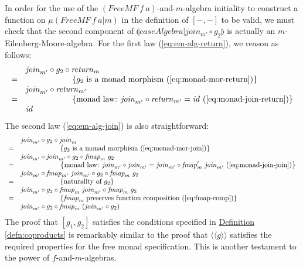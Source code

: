 \documentclass{jfp1}
\newcommand{\eFold}[2]{\llparenthesis #1|#2 \rrparenthesis}
\newcommand{\fmext}[1]{\langle\langle #1 \rangle\rangle}
\newcommand{\eqAnnotation}[1]{\hspace{2cm}\left\{\textrm{#1}\right\}}
\newcommand{\defref}[1]{\hyperref[#1]{Definition \ref*{#1}}}
\begin{document}
In order for the use of the $(\mathit{FreeMF}~f~a)$-and-$m$-algebra
initiality to construct a function on $\mu(\mathit{FreeMF}~f~a|m)$ in
the definition of $[-,-]$ to be valid, we must check that the second
component of $\eFold{\mathit{caseAlgebra}}{\mathit{join_{m'}} \circ
  g_2}$ is actually an $m$-Eilenberg-Moore-algebra. For the first law
(\autoref{eq:em-alg-return}), we reason as follows:
\begin{displaymath}
  \begin{array}{cl}
    & \mathit{join}_{m'} \circ g_2 \circ \mathit{return}_m \\
    =&\eqAnnotation{$g_2$ is a monad morphism (\autoref{eq:monad-mor-return})} \\
    & \mathit{join}_{m'} \circ \mathit{return}_{m'} \\
    =&\eqAnnotation{monad law: $\mathit{join}_{m'} \circ \mathit{return}_{m'} = \mathit{id}$ (\autoref{eq:monad-join-return})} \\
    & \mathit{id}
  \end{array}
\end{displaymath}
The second law (\autoref{eq:em-alg-join}) is also straightforward:
\begin{displaymath}
  \begin{array}{cl}
    & \mathit{join}_{m'} \circ g_2 \circ \mathit{join}_m \\
    =&\eqAnnotation{$g_2$ is a monad morphism (\autoref{eq:monad-mor-join})} \\
    & \mathit{join}_{m'} \circ \mathit{join}_{m'} \circ g_2 \circ \mathit{fmap}_m~g_2 \\
    =&\eqAnnotation{monad law: $\mathit{join}_{m'} \circ \mathit{join}_{m'} = \mathit{join}_{m'} \circ \mathit{fmap}_m'~\mathit{join}_{m'}$ (\autoref{eq:monad-join-join})} \\
    & \mathit{join}_{m'} \circ \mathit{fmap}_{m'}~\mathit{join}_{m'} \circ g_2 \circ \mathit{fmap}_m~g_2 \\
    =&\eqAnnotation{naturality of $g_2$} \\
    & \mathit{join}_{m'} \circ g_2 \circ \mathit{fmap}_{m}~\mathit{join}_{m'} \circ \mathit{fmap}_m~g_2 \\
    =&\eqAnnotation{$\mathit{fmap}_m$ preserves function composition (\autoref{eq:fmap-comp})} \\
    & \mathit{join}_{m'} \circ g_2 \circ \mathit{fmap}_{m}~(\mathit{join}_{m'} \circ g_2)
  \end{array}
\end{displaymath}
The proof that $[g_1,g_2]$ satisfies the conditions specified in
\defref{defn:coproducts} is remarkably similar to the proof that
$\fmext{g}$ satisfies the required properties for the free monad
specification. This is another testament to the power of
$f$-and-$m$-algebras.



\end{document}
